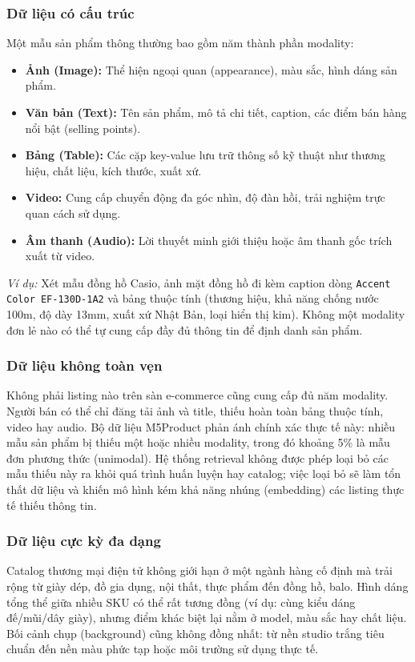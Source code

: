 \documentclass[10pt,conference]{IEEEtran}
\begin{document}
\subsubsection{Dữ liệu có cấu trúc}
Một mẫu sản phẩm thông thường bao gồm năm thành phần modality:
\begin{itemize}[leftmargin=*]
    \item \textbf{Ảnh (Image):} Thể hiện ngoại quan (appearance), màu sắc, hình dáng sản phẩm.
    \item \textbf{Văn bản (Text):} Tên sản phẩm, mô tả chi tiết, caption, các điểm bán hàng nổi bật (selling points).
    \item \textbf{Bảng (Table):} Các cặp key-value lưu trữ thông số kỹ thuật như thương hiệu, chất liệu, kích thước, xuất xứ.
    \item \textbf{Video:} Cung cấp chuyển động đa góc nhìn, độ đàn hồi, trải nghiệm trực quan cách sử dụng.
    \item \textbf{Âm thanh (Audio):} Lời thuyết minh giới thiệu hoặc âm thanh gốc trích xuất từ video.
\end{itemize}
\textit{Ví dụ:} Xét mẫu đồng hồ Casio, ảnh mặt đồng hồ đi kèm caption dòng \texttt{Accent Color EF-130D-1A2} và bảng thuộc tính (thương hiệu, khả năng chống nước 100m, độ dày 13mm, xuất xứ Nhật Bản, loại hiển thị kim). Không một modality đơn lẻ nào có thể tự cung cấp đầy đủ thông tin để định danh sản phẩm.

\subsubsection{Dữ liệu không toàn vẹn}
Không phải listing nào trên sàn e-commerce cũng cung cấp đủ năm modality. Người bán có thể chỉ đăng tải ảnh và title, thiếu hoàn toàn bảng thuộc tính, video hay audio. Bộ dữ liệu M5Product phản ánh chính xác thực tế này: nhiều mẫu sản phẩm bị thiếu một hoặc nhiều modality, trong đó khoảng 5\% là mẫu đơn phương thức (unimodal). Hệ thống retrieval không được phép loại bỏ các mẫu thiếu này ra khỏi quá trình huấn luyện hay catalog; việc loại bỏ sẽ làm tổn thất dữ liệu và khiến mô hình kém khả năng nhúng (embedding) các listing thực tế thiếu thông tin.

\subsubsection{Dữ liệu cực kỳ đa dạng}
Catalog thương mại điện tử không giới hạn ở một ngành hàng cố định mà trải rộng từ giày dép, đồ gia dụng, nội thất, thực phẩm đến đồng hồ, balo. Hình dáng tổng thể giữa nhiều SKU có thể rất tương đồng (ví dụ: cùng kiểu dáng đế/mũi/dây giày), nhưng điểm khác biệt lại nằm ở model, màu sắc hay chất liệu. Bối cảnh chụp (background) cũng không đồng nhất: từ nền studio trắng tiêu chuẩn đến nền màu phức tạp hoặc môi trường sử dụng thực tế.
\end{document}
